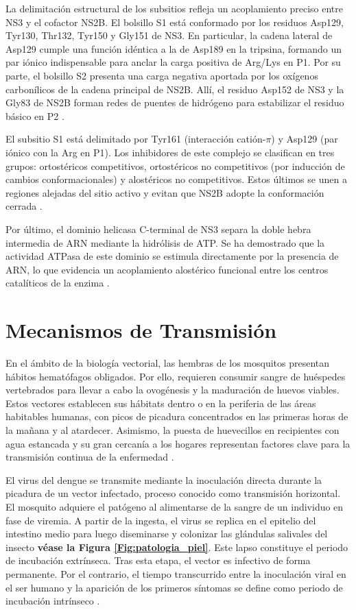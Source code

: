 La delimitación estructural de los subsitios refleja un acoplamiento preciso entre NS3 y el cofactor NS2B. El bolsillo S1 está conformado por los residuos Asp129, Tyr130, Thr132, Tyr150 y Gly151 de NS3. En particular, la cadena lateral de Asp129 cumple una función idéntica a la de Asp189 en la tripsina, formando un par iónico indispensable para anclar la carga positiva de Arg/Lys en P1. Por su parte, el bolsillo S2 presenta una carga negativa aportada por los oxígenos carbonílicos de la cadena principal de NS2B. Allí, el residuo Asp152 de NS3 y la Gly83 de NS2B forman redes de puentes de hidrógeno para estabilizar el residuo básico en P2 \cite{li2020insights}.

El subsitio S1 está delimitado por Tyr161 (interacción catión-$\pi$) y Asp129 (par iónico con la Arg en P1). Los inhibidores de este complejo se clasifican en tres grupos: ortostéricos competitivos, ortostéricos no competitivos (por inducción de cambios conformacionales) y alostéricos no competitivos. Estos últimos se unen a regiones alejadas del sitio activo y evitan que NS2B adopte la conformación cerrada \cite{cavina2024orthoflaviviral}.

Por último, el dominio helicasa C-terminal de NS3 separa la doble hebra intermedia de ARN mediante la hidrólisis de ATP. Se ha demostrado que la actividad ATPasa de este dominio se estimula directamente por la presencia de ARN, lo que evidencia un acoplamiento alostérico funcional entre los centros catalíticos de la enzima \cite{lescar2008towards}.
\section{Mecanismos de Transmisión}
En el ámbito de la biología vectorial, las hembras de los mosquitos presentan hábitos hematófagos obligados. Por ello, requieren consumir sangre de huéspedes vertebrados para llevar a cabo la ovogénesis y la maduración de huevos viables. Estos vectores establecen sus hábitats dentro o en la periferia de las áreas habitables humanas, con picos de picadura concentrados en las primeras horas de la mañana y al atardecer. Asimismo, la puesta de huevecillos en recipientes con agua estancada y su gran cercanía a los hogares representan factores clave para la transmisión continua de la enfermedad \cite{fajardo2012dengue}.

El virus del dengue se transmite mediante la inoculación directa durante la picadura de un vector infectado, proceso conocido como transmisión horizontal. El mosquito adquiere el patógeno al alimentarse de la sangre de un individuo en fase de viremia. A partir de la ingesta, el virus se replica en el epitelio del intestino medio para luego diseminarse y colonizar las glándulas salivales del insecto \textbf{véase la Figura \ref{Fig:patologia_piel}}. Este lapso constituye el periodo de incubación extrínseca. Tras esta etapa, el vector es infectivo de forma permanente. Por el contrario, el tiempo transcurrido entre la inoculación viral en el ser humano y la aparición de los primeros síntomas se define como periodo de incubación intrínseco  \cite{salvadorgenetica}.

